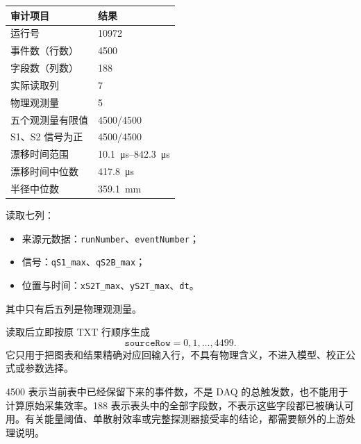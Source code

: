 \documentclass[UTF8,11pt,a4paper,oneside,fontset=none]{ctexart}
\begin{document}
\vspace{0.35em}
\begin{minipage}[t]{0.55\textwidth}
\begin{tabularx}{\linewidth}{@{}Y R{3.15cm}@{}}
\toprule
{}\textbf{审计项目} & \textbf{结果}\\
\midrule
运行号 & 10972\\
事件数（行数） & \num{4500}\\
字段数（列数） & 188\\
实际读取列 & 7\\
物理观测量 & 5\\
五个观测量有限值 & \num{4500}/\num{4500}\\
S1、S2 信号为正 & \num{4500}/\num{4500}\\
漂移时间范围 & \SIrange{10.1}{842.3}{\micro\second}\\
漂移时间中位数 & \SI{417.8}{\micro\second}\\
半径中位数 & \SI{359.1}{\milli\metre}\\
\bottomrule
\end{tabularx}
\end{minipage}\hfill
\begin{minipage}[t]{0.41\textwidth}
\begin{infobox}[title={分析入口},fonttitle=\bfseries]
读取七列：
\begin{itemize}
  \item 来源元数据：\texttt{runNumber}、\texttt{eventNumber}；
  \item 信号：\texttt{qS1\_max}、\texttt{qS2B\_max}；
  \item 位置与时间：\texttt{xS2T\_max}、\texttt{yS2T\_max}、\texttt{dt}。
\end{itemize}
其中只有后五列是物理观测量。
\end{infobox}

\vspace{0.35em}
\begin{notebox}[title={事件对齐方式}]
读取后立即按原 TXT 行顺序生成
\[
  \texttt{sourceRow}=0,1,\ldots,4499.
\]
它只用于把图表和结果精确对应回输入行，不具有物理含义，不进入模型、校正公式或参数选择。
\end{notebox}
\end{minipage}

\vspace{0.55em}
\begin{scopebox}
4500 表示当前表中已经保留下来的事件数，不是 DAQ 的总触发数，也不能用于计算原始采集效率。188 表示表头中的全部字段数，不表示这些字段都已被确认可用。有关能量阈值、单散射效率或完整探测器接受率的结论，都需要额外的上游处理说明。
\end{scopebox}
\end{document}
